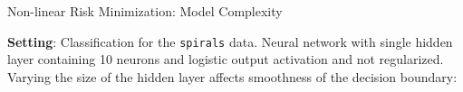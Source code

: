 \begin{frame}{Non-linear Risk Minimization: Model Complexity}

\small

\textbf{Setting}: Classification for the \texttt{spirals} data.
Neural network with single hidden layer containing 10 neurons and logistic 
output activation and not regularized. 
Varying the size of the hidden layer affects smoothness of the decision boundary:

\vfill

\begin{center}

\end{center}
\end{frame}
